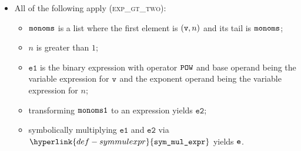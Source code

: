 \documentclass{book}
\newcommand\symmulexpr[0]{\hyperlink{def-symmulexpr}{\texttt{sym\_mul\_expr}}}
\newcommand\veone[0]{\texttt{e1}}
\newcommand\vetwo[0]{\texttt{e2}}
\begin{document}
\begin{itemize}
  \item All of the following apply (\textsc{exp\_gt\_two}):
  \begin{itemize}
    \item $\texttt{monoms}$ is a list where the first element is $(\texttt{v}, n)$ and its tail is $\texttt{monoms}$;
    \item $n$ is greater than $1$;
    \item $\veone$ is the binary expression with operator $\texttt{POW}$ and base operand being the variable expression for $\texttt{v}$
          and the exponent operand being the variable expression for $n$;
    \item transforming $\texttt{monoms1}$ to an expression yields $\vetwo$;
    \item symbolically multiplying $\veone$ and $\vetwo$ via $\symmulexpr$ yields $\texttt{e}$.
  \end{itemize}
\end{itemize}
\end{document}
